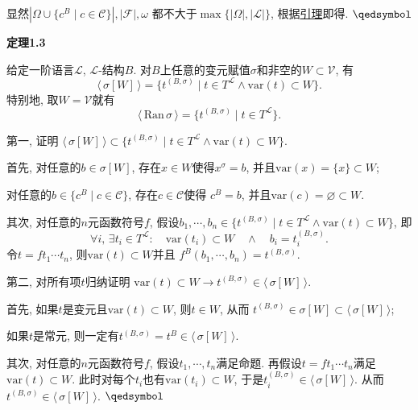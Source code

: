
显然$|\Omega\cup\{c^B\mid c\in\mathcal{C}\}|, |\mathcal{F}|, \omega$
都不大于$\max\{|\Omega|,|\mathcal{L}|\}$,
根据\href{../../01 一阶语言/01 一阶语言#nameddest=sec:定理A1.1}{引理}即得.
\hfill $\qedsymbol$

\vspace{10pt}

\hypertarget{sec:定理1.3}{}
\noindent\textbf{定理1.3}

给定一阶语言$\mathcal{L}$, $\mathcal{L}$-结构$B$.
对$B$上任意的变元赋值$\sigma$和非空的$W\subset\mathcal{V}$, 有
\[
    \langle\,\sigma[W]\,\rangle=\{t^{(B,\sigma)}\mid
    t\in T^{\mathcal{L}}\land\mathrm{var}(t)\subset W\}.
\]
特别地, 取$W=\mathcal{V}$就有
\[
    \langle\,\mathrm{Ran}\,\sigma\,\rangle=
    \{t^{(B,\sigma)}\mid t\in T^{\mathcal{L}}\}.
\]


第一, 证明
$\langle\,\sigma[W]\,\rangle\subset\{t^{(B,\sigma)}\mid
t\in T^{\mathcal{L}}\land\mathrm{var}(t)\subset W\}$.

首先, 对任意的$b\in\sigma[W]$, 存在$x\in W$使得$x^\sigma=b$,
并且$\mathrm{var}(x)=\{x\}\subset W$;

对任意的$b\in\{c^B\mid c\in\mathcal{C}\}$, 存在$c\in\mathcal{C}$使得
$c^B=b$, 并且$\mathrm{var}(c)=\varnothing\subset W$.

其次, 对任意的$n$元函数符号$f$, 假设$b_1,\cdots,b_n\in\{t^{(B,\sigma)}\mid
t\in T^{\mathcal{L}}\land\mathrm{var}(t)\subset W\}$, 即
\[
    \forall i,\,\exists t_i\in T^{\mathcal{L}}:\quad
    \mathrm{var}(t_i)\subset W\quad\land\quad b_i=t_i^{(B,\sigma)}.
\]
令$t=ft_1\cdots t_n$, 则$\mathrm{var}(t)\subset W$并且
$f^B(b_1,\cdots,b_n)=t^{(B,\sigma)}$.

第二, 对所有项$t$归纳证明
$\mathrm{var}(t)\subset W\to t^{(B,\sigma)}\in\langle\,\sigma[W]\,\rangle$.

首先, 如果$t$是变元且$\mathrm{var}(t)\subset W$, 则$t\in W$, 从而
$t^{(B,\sigma)}\in\sigma[W]\subset\langle\,\sigma[W]\,\rangle$;

如果$t$是常元, 则一定有$t^{(B,\sigma)}=t^B\in\langle\,\sigma[W]\,\rangle$.

其次, 对任意的$n$元函数符号$f$, 假设$t_1,\cdots,t_n$满足命题.
再假设$t=ft_1\cdots t_n$满足$\mathrm{var}(t)\subset W$.
此时对每个$t_i$也有$\mathrm{var}(t_i)\subset W$,
于是$t_i^{(B,\sigma)}\in\langle\,\sigma[W]\,\rangle$. 从而
$t^{(B,\sigma)}\in\langle\,\sigma[W]\,\rangle$. \hfill $\qedsymbol$





